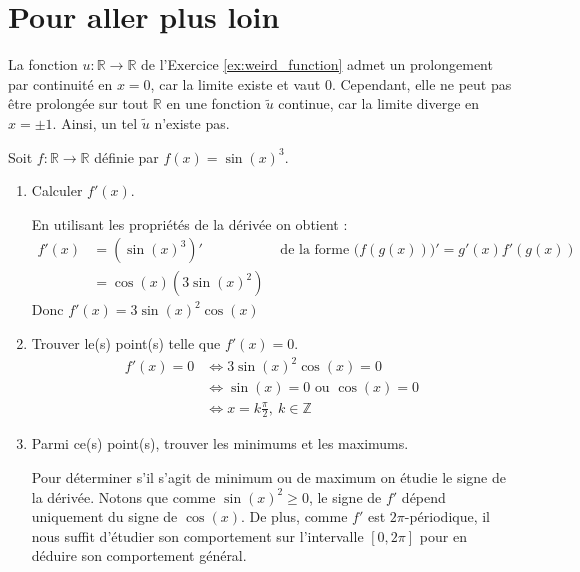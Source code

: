 \part{Pour aller plus loin\textellipsis}

\begin{exercice}
La fonction $u : \mathbb{R} \to \mathbb{R}$ de l'Exercice \ref{ex:weird_function} admet un prolongement par continuité en $x = 0$, car la limite existe et vaut $0$. Cependant, elle ne peut pas être prolongée sur tout $\mathbb{R}$ en une fonction $\tilde{u}$ continue, car la limite diverge en $x = \pm 1$. Ainsi, un tel $\tilde{u}$ n'existe pas.
\end{exercice}

\begin{exercice}
Soit $f : \mathbb{R} \to \mathbb{R}$ définie par $f(x) = \sin(x)^3$.

\begin{enumerate}
    \item Calculer $f'(x)$.
    
    En utilisant les propriétés de la dérivée on obtient :
    \begin{align*}
        f'(x) &= \left( \sin(x)^3 \right)' & \textrm{ de la forme } \big( f(g(x)) \big)' = g'(x) f'(g(x)) \\
        &= \cos(x) \left( 3 \sin(x)^2 \right)
    \end{align*}
    Donc $f'(x) = 3 \sin(x)^2 \cos(x)$
    
    \item Trouver le(s) point(s) telle que $f'(x) = 0$.
    \begin{align*}
        f'(x) = 0 & \iff 3 \sin(x)^2 \cos(x) = 0 \\
                  & \iff \sin(x) = 0 \textrm{ ou } \cos(x) = 0 \\
                  & \iff x = k \frac{\pi}{2}, \ k \in \mathbb{Z} 
    \end{align*}
    
    \item Parmi ce(s) point(s), trouver les minimums et les maximums.
    
    Pour déterminer s'il s'agit de minimum ou de maximum on étudie le signe de la dérivée. Notons que comme $\sin(x)^2 \geq 0$, le signe de $f'$ dépend uniquement du signe de $\cos(x)$. De plus, comme $f'$ est $2\pi$-périodique, il nous suffit d'étudier son comportement sur l'intervalle $[0, 2\pi]$ pour en déduire son comportement général.
    

\end{enumerate}
\end{exercice}
